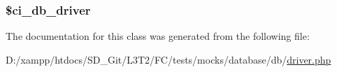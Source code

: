 \subsubsection[{\$ci\+\_\+db\+\_\+driver}]{\setlength{\rightskip}{0pt plus 5cm}\$ci\+\_\+db\+\_\+driver\hspace{0.3cm}{\ttfamily [protected]}}\label{class_mock___database___d_b___driver_aebf487ba6f39ae3b9bf272a78ae3f069}


The documentation for this class was generated from the following file\+:\begin{DoxyCompactItemize}
\item 
D\+:/xampp/htdocs/\+S\+D\+\_\+\+Git/\+L3\+T2/\+F\+C/tests/mocks/database/db/\hyperlink{tests_2mocks_2database_2db_2_driver_8php}{driver.\+php}\end{DoxyCompactItemize}
